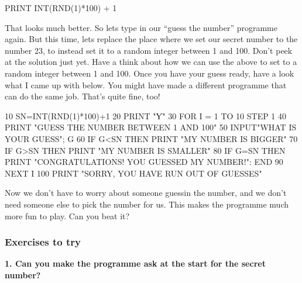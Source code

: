 \begin{screenoutput}
  PRINT INT(RND(1)*100) + 1
\end{screenoutput}

\needspace{3cm}
That looks much better. So lets type in our ``guess the number''
programme again. But this time, lets replace the place where we set
our secret number to the number 23, to instead set it to a random
integer between 1 and 100.  Don't peek at the solution just yet. Have a
think about how we can use the above to set  to a random
integer between 1 and 100.  Once you have your guess ready, have a
look what I came up with below. You might have made a different
programme that can do the same job. That's quite fine, too!

\begin{screentext}
10 SN=INT(RND(1)*100)+1
20 PRINT "Ƴ"
30 FOR I = 1 TO 10 STEP 1
40 PRINT "GUESS THE NUMBER BETWEEN 1 AND 100"                                    
50 INPUT"WHAT IS YOUR GUESS"; G                                                    
60 IF G<SN THEN PRINT "MY NUMBER IS BIGGER"                                       
70 IF G>SN THEN PRINT "MY NUMBER IS SMALLER"                                      
80 IF G=SN THEN PRINT "CONGRATULATIONS! YOU GUESSED MY NUMBER!": END
90 NEXT I
100 PRINT "SORRY, YOU HAVE RUN OUT OF GUESSES"
\end{screentext}

Now we don't have to worry about someone guessin the number, and we
don't need someone else to pick the number for us. This makes the
programme much more fun to play.  Can you beat it?


\subsubsection{Exercises to try}
  
{\bf 1. Can you make the programme ask at the start for the secret number?}
